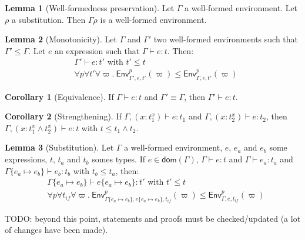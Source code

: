 \documentclass[a4paper]{article}%
\newcommand{\dom}[1]{\textsf{dom}(#1)}
\newcommand{\subst}[2]{\{#1 \mapsto #2\}}
\newcommand{\Gp}[2]{\textsf{Env}^{#1}_{#2}}
\theoremstyle{definition}
\newtheorem{lemma}{Lemma}
\newtheorem{corollary}{Corollary}
\begin{document}
        \begin{lemma}[Well-formedness preservation]
          Let $\Gamma$ a well-formed environment. Let $\rho$ a substitution.
          Then $\Gamma\rho$ is a well-formed environment.
        \end{lemma}
    
        \begin{lemma}[Monotonicity]
          Let $\Gamma$ and $\Gamma'$ two well-formed environments such that $\Gamma' \leq \Gamma$. Let $e$ an expression such that $\Gamma \vdash e:t$.
          Then:\\
          \begin{align*}
            &\Gamma' \vdash e:t' \text{ with } t' \leq t\\
            &\forall p \forall t' \forall \varpi.\ \Gp p {\Gamma',e,t'} (\varpi) \leq \Gp p {\Gamma,e,t'} (\varpi)
          \end{align*}
        \end{lemma}
    
        \begin{corollary}[Equivalence]
          If $\Gamma \vdash e:t$ and $\Gamma' \equiv \Gamma$, then $\Gamma' \vdash e:t$.
        \end{corollary}
    
        \begin{corollary}[Strengthening]
          If $\Gamma, (x:t_1^x) \vdash e:t_1$ and $\Gamma, (x:t_2^x) \vdash e:t_2$, then
          $\Gamma, (x:t_1^x\land t_2^x) \vdash e:t$ with $t \leq t_1\land t_2$.
        \end{corollary}
    
        \begin{lemma}[Substitution]
          Let $\Gamma$ a well-formed environment, $e$, $e_a$ and $e_b$ some expressions, $t$, $t_a$ and $t_b$ somes types.
          If $e \in \dom \Gamma$, $\Gamma \vdash e:t$ and $\Gamma \vdash e_a : t_a$ and $\Gamma\subst {e_a} {e_b} \vdash e_b:t_b$ with $t_b \leq t_a$, then:
          \begin{align*}
            &\Gamma \subst {e_a} {e_b} \vdash e \subst {e_a} {e_b}:t' \text{ with } t'\leq t\\
            &\forall p \forall t_{if} \forall \varpi.\ \Gp p {\Gamma\subst {e_a} {e_b},e\subst {e_a} {e_b},t_{if}} (\varpi) \leq \Gp p {\Gamma,e,t_{if}} (\varpi)
          \end{align*}
        \end{lemma}
    
        TODO: beyond this point, statements and proofs must be checked/updated (a lot of changes have been made).
\end{document}
